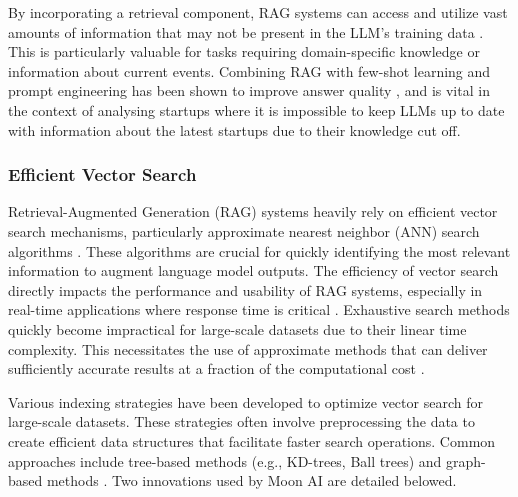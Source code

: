 \documentclass[a4paper, oneside]{discothesis}
\begin{document}
By incorporating a retrieval component, RAG systems can access and utilize vast amounts of information that may not be present in the LLM's training data \cite{lewis2020retrieval}. This is particularly valuable for tasks requiring domain-specific knowledge or information about current events.
Combining RAG with few-shot learning and prompt engineering has been shown to improve answer quality \cite{liu2021pre}, and is vital in the context of analysing startups where it is impossible to keep LLMs up to date with information about the latest startups due to their knowledge cut off.


\subsubsection{Efficient Vector Search}
Retrieval-Augmented Generation (RAG) systems heavily rely on efficient vector search mechanisms, particularly approximate nearest neighbor (ANN) search algorithms \cite{johnson2017billion}. These algorithms are crucial for quickly identifying the most relevant information to augment language model outputs. The efficiency of vector search directly impacts the performance and usability of RAG systems, especially in real-time applications where response time is critical \cite{lewis2020retrieval}. Exhaustive search methods quickly become impractical for large-scale datasets due to their linear time complexity. This necessitates the use of approximate methods that can deliver sufficiently accurate results at a fraction of the computational cost \cite{andoni2018approximate}.

Various indexing strategies have been developed to optimize vector search for large-scale datasets. These strategies often involve preprocessing the data to create efficient data structures that facilitate faster search operations. Common approaches include tree-based methods (e.g., KD-trees, Ball trees) and graph-based methods \cite{malkov2018efficient}. Two innovations used by Moon AI are detailed belowed.
\end{document}
